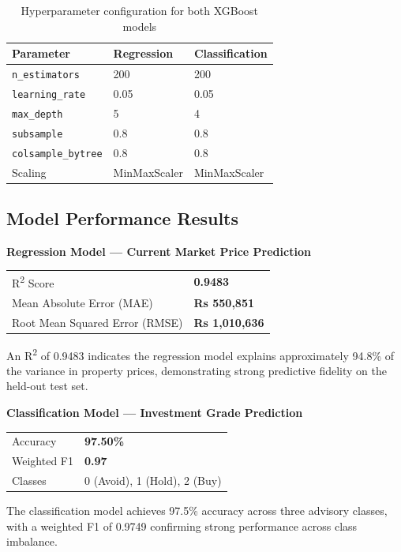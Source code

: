 \documentclass[12pt,a4paper]{article}
\begin{document}
\begin{table}[H]
\centering
\caption{Hyperparameter configuration for both XGBoost models}
\begin{tabular}{lll}
\toprule
\textbf{Parameter} & \textbf{Regression} & \textbf{Classification} \\
\midrule
\texttt{n\_estimators}  & 200   & 200 \\
\texttt{learning\_rate} & 0.05  & 0.05 \\
\texttt{max\_depth}     & 5     & 4 \\
\texttt{subsample}      & 0.8   & 0.8 \\
\texttt{colsample\_bytree} & 0.8 & 0.8 \\
Scaling                 & MinMaxScaler & MinMaxScaler \\
\bottomrule
\end{tabular}
\end{table}

\subsection{Model Performance Results}

\begin{resultbox}
\textbf{Regression Model --- Current Market Price Prediction}

\begin{tabular}{ll}
R\textsuperscript{2} Score & \textbf{0.9483} \\
Mean Absolute Error (MAE)  & \textbf{Rs 550,851} \\
Root Mean Squared Error (RMSE) & \textbf{Rs 1,010,636} \\
\end{tabular}

\vspace{0.5em}
An R\textsuperscript{2} of 0.9483 indicates the regression model explains approximately 94.8\% of the variance in property prices, demonstrating strong predictive fidelity on the held-out test set.
\end{resultbox}

\vspace{0.5em}

\begin{resultbox}
\textbf{Classification Model --- Investment Grade Prediction}

\begin{tabular}{ll}
Accuracy       & \textbf{97.50\%} \\
Weighted F1    & \textbf{0.97} \\
Classes        & 0 (Avoid), 1 (Hold), 2 (Buy) \\
\end{tabular}

\vspace{0.5em}
The classification model achieves 97.5\% accuracy across three advisory classes, with a weighted F1 of 0.9749 confirming strong performance across class imbalance.
\end{resultbox}
\end{document}
